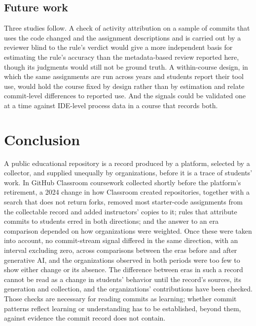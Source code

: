 \documentclass[acmsmall,screen,review,anonymous]{acmart}
\begin{document}
\subsection{Future work}

Three studies follow. A check of activity attribution on a sample of commits that uses the code changed and the assignment descriptions and is carried out by a reviewer blind to the rule's verdict would give a more independent basis for estimating the rule's accuracy than the metadata-based review reported here, though its judgments would still not be ground truth. A within-course design, in which the same assignments are run across years and students report their tool use, would hold the course fixed by design rather than by estimation and relate commit-level differences to reported use. And the signals could be validated one at a time against IDE-level process data in a course that records both.

\section{Conclusion}
\label{sec:conclusion}

A public educational repository is a record produced by a platform, selected by a collector, and supplied unequally by organizations, before it is a trace of students' work. In GitHub Classroom coursework collected shortly before the platform's retirement, a 2024 change in how Classroom created repositories, together with a search that does not return forks, removed most starter-code assignments from the collectable record and added instructors' copies to it; rules that attribute commits to students erred in both directions; and the answer to an era comparison depended on how organizations were weighted. Once these were taken into account, no commit-stream signal differed in the same direction, with an interval excluding zero, across comparisons between the eras before and after generative AI, and the organizations observed in both periods were too few to show either change or its absence. The difference between eras in such a record cannot be read as a change in students' behavior until the record's sources, its generation and collection, and the organizations' contributions have been checked. Those checks are necessary for reading commits as learning; whether commit patterns reflect learning or understanding has to be established, beyond them, against evidence the commit record does not contain.
\end{document}
